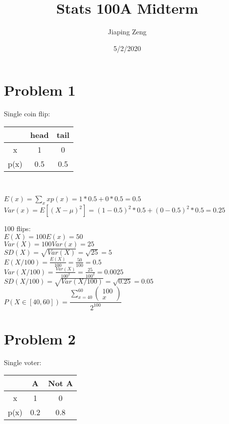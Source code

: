 \documentclass{article}
\title{Stats 100A Midterm}
\author{Jiaping Zeng}
\date{5/2/2020}
\begin{document}
\maketitle

\section*{Problem 1}

Single coin flip:\\
\begin{tabular}{|c|c|c|}
	\hline
	     & head & tail \\
	\hline
	x    & 1    & 0    \\
	\hline
	p(x) & 0.5  & 0.5  \\
	\hline
\end{tabular}\\

\begin{flushleft}
	$E(x)=\sum_x xp(x)=1*0.5+0*0.5=0.5$\\
	$Var(x)=E[(X-\mu)^2]=(1-0.5)^2*0.5+(0-0.5)^2*0.5=0.25$\\
\end{flushleft}
\begin{flushleft}
	100 flips:\\
	$E(X)=100E(x)=\boxed{50}$\\
	$Var(X)=100Var(x)=\boxed{25}$\\
	$SD(X)=\sqrt{Var(X)}=\sqrt{25}=\boxed{5}$\\
	$E(X/100)=\frac{E(X)}{100}=\frac{50}{100}=\boxed{0.5}$\\
	$Var(X/100)=\frac{Var(X)}{100^2}=\frac{25}{100^2}=\boxed{0.0025}$\\
	$SD(X/100)=\sqrt{Var(X/100)}=\sqrt{0.25}=\boxed{0.05}$\\
	$P(X\in[40,60])=\boxed{\dfrac{\sum_{x=40}^{60}\begin{pmatrix}100\\x\end{pmatrix}}{2^{100}}}$
\end{flushleft}

\section*{Problem 2}
Single voter:\\
\begin{tabular}{|c|c|c|}
	\hline
	     & A   & Not A \\
	\hline
	x    & 1   & 0     \\
	\hline
	p(x) & 0.2 & 0.8   \\
	\hline
\end{tabular}\\
\end{document}
